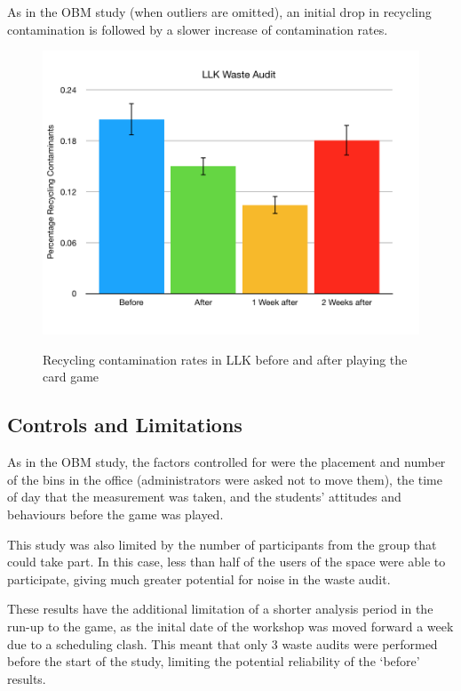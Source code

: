 \documentclass[nofonts,nols,justified,nobib]{tufte-book}
\begin{document}
As in the OBM study (when outliers are omitted), an initial drop in recycling contamination is followed by a slower increase of contamination rates.

\begin{figure}
  \caption{Recycling contamination rates in LLK before and after playing the card game}
  \includegraphics[width=1\linewidth]{img/4/finalresults/llk-wasteaudit.png}
  \label{contamination}
\end{figure}

\subsection*{Controls and Limitations}
As in the OBM study, the factors controlled for were the placement and number of the bins in the office (administrators were asked not to move them), the time of day that the measurement was taken, and the students' attitudes and behaviours before the game was played.

This study was also limited by the number of participants from the group that could take part. In this case, less than half of the users of the space were able to participate, giving much greater potential for noise in the waste audit. 

These results have the additional limitation of a shorter analysis period in the run-up to the game, as the inital date of the workshop was moved forward a week due to a scheduling clash. This meant that only 3 waste audits were performed before the start of the study, limiting the potential reliability of the `before' results.
\end{document}
